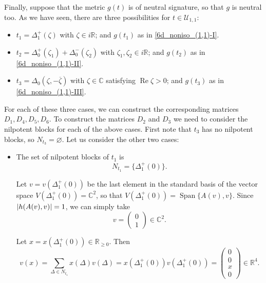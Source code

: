 \documentclass{article}
\theoremstyle{definition}
\newcommand{\R}{\mathbb{R}}
\newcommand{\C}{\mathbb{C}}
\renewcommand{\Re}{\operatorname{Re}}
\DeclarePairedDelimiter{\abs}{\lvert}{\rvert}
\newcommand{\Span}[1]{\operatorname{Span}\{#1\}}
\begin{document}
Finally, suppose that the metric $g(t)$ is of neutral signature, so that $g$ is neutral too. As we have seen, there are three possibilities for $t\in\mathcal{U}_{1,1}$: \begin{itemize}
    \item $t_1=\Delta_1^+(\zeta)$ with $\zeta\in i\R$; and $g(t_1)$ as in \eqref{6d_noniso_(1,1)-I}.
    \item $t_2=\Delta_0^+(\zeta_1)+\Delta_0^-(\zeta_2)$ with $\zeta_1,\zeta_2\in i\R$; and $g(t_2)$ as in \eqref{6d_noniso_(1,1)-II}.
    \item $t_3=\Delta_0(\zeta,-\overline{\zeta})$ with $\zeta\in\C$ satisfying $\Re\zeta>0$; and $g(t_3)$ as in \eqref{6d_noniso_(1,1)-III}.
\end{itemize}

For each of these three cases, we can construct the corresponding matrices $D_1,D_4,D_5,D_6$. To construct the matrices $D_2$ and $D_3$ we need to consider the nilpotent blocks for each of the above cases. First note that $t_3$ has no nilpotent blocks, so $N_{t_3}=\varnothing$. Let us consider the other two cases: \begin{itemize}
    \item The set of nilpotent blocks of $t_1$ is $$N_{t_1}=\{\Delta_1^+(0)\}.$$

    Let $v=v(\Delta_1^+(0))$ be the last element in the standard basis of the vector space $V(\Delta_1^+(0))=\C^2$, so that $V(\Delta_1^+(0))=\Span{A(v),v}$. Since $\abs{h(A(v),v)}=1$, we can simply take $$v=\begin{pmatrix}
        0\\1
    \end{pmatrix}\in\C^2.$$

    Let $x=x(\Delta_1^+(0))\in\R_{\geq0}$. Then $$v(x)=\sum_{\Delta\in N_{t_1}}x(\Delta)v(\Delta)=x(\Delta_1^+(0))v(\Delta_1^+(0))=\begin{pmatrix}
        0\\0\\x\\0
    \end{pmatrix}\in\R^4.$$


\end{itemize}
\end{document}
